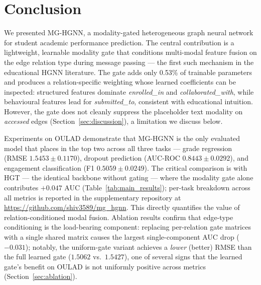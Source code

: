 \documentclass[sigconf,review]{acmart}
\begin{document}
\section{Conclusion}
\label{sec:conclusion}
We presented MG-HGNN, a modality-gated heterogeneous
graph neural network for student academic performance
prediction. The central contribution is a lightweight,
learnable modality gate that conditions multi-modal
feature fusion on the edge relation type during
message passing --- the first such mechanism in the
educational HGNN literature. The gate adds only 0.53\%
of trainable parameters and produces a relation-specific
weighting whose learned coefficients can be inspected:
structured features dominate
\textit{enrolled\_in} and \textit{collaborated\_with},
while behavioural features lead for
\textit{submitted\_to}, consistent with educational
intuition. However, the gate does not cleanly suppress
the placeholder text modality on \textit{accessed}
edges (Section~\ref{sec:discussion}), a limitation we
discuss below.

Experiments on OULAD demonstrate that MG-HGNN is the
only evaluated model that places in the top two across
all three tasks --- grade regression (RMSE
$1.5453 \pm 0.1170$), dropout prediction (AUC-ROC
$0.8443 \pm 0.0292$), and engagement classification
(F1 $0.5059 \pm 0.0249$). The critical comparison is
with HGT --- the identical backbone without gating ---
where the modality gate alone contributes $+0.047$
AUC (Table~\ref{tab:main_results}); per-task breakdown
across all metrics is reported in the supplementary
repository at \url{https://github.com/shiv3589/mg_hgnn}.
This directly quantifies the value of
relation-conditioned modal fusion. Ablation results confirm that edge-type
conditioning is the load-bearing component: replacing
per-relation gate matrices with a single shared matrix
causes the largest single-component AUC drop
($-0.031$); notably, the uniform-gate variant achieves
a \emph{lower} (better) RMSE than the full learned gate
($1.5062$ vs.\ $1.5427$), one of several signs that the
learned gate's benefit on OULAD is not uniformly
positive across metrics (Section~\ref{sec:ablation}).
\end{document}
